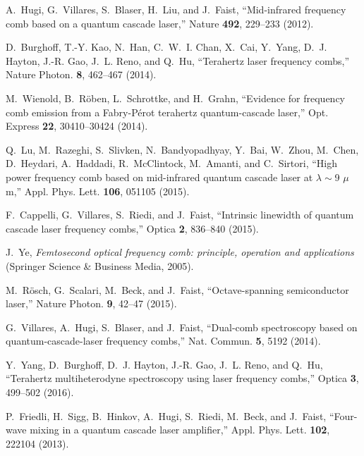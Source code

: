 \documentclass[10pt]{article}
\begin{document}
\begin{thebibliography}{10}
	\newcommand{\enquote}[1]{``#1''}
	
	A.~Hugi, G.~Villares, S.~Blaser, H.~Liu, and J.~Faist, \enquote{Mid-infrared
		frequency comb based on a quantum cascade laser,} Nature \textbf{492},
	229--233 (2012).
	
	D.~Burghoff, T.-Y. Kao, N.~Han, C.~W.~I. Chan, X.~Cai, Y.~Yang, D.~J. Hayton,
	J.-R. Gao, J.~L. Reno, and Q.~Hu, \enquote{Terahertz laser frequency combs,}
	Nature Photon. \textbf{8}, 462--467 (2014).
	
	M.~Wienold, B.~R{\"o}ben, L.~Schrottke, and H.~Grahn, \enquote{{Evidence for
			frequency comb emission from a Fabry-P{\'e}rot terahertz quantum-cascade
			laser},} Opt. Express \textbf{22}, 30410--30424 (2014).
	
	Q.~Lu, M.~Razeghi, S.~Slivken, N.~Bandyopadhyay, Y.~Bai, W.~Zhou, M.~Chen,
	D.~Heydari, A.~Haddadi, R.~McClintock, M.~Amanti, and C.~Sirtori,
	\enquote{High power frequency comb based on mid-infrared quantum cascade
		laser at $\lambda\sim$9 $\mu$m,} Appl. Phys. Lett. \textbf{106}, 051105
	(2015).
	
	F.~Cappelli, G.~Villares, S.~Riedi, and J.~Faist, \enquote{Intrinsic linewidth
		of quantum cascade laser frequency combs,} Optica \textbf{2}, 836--840
	(2015).
	
	J.~Ye, \emph{Femtosecond optical frequency comb: principle, operation and
		applications} (Springer Science \& Business Media, 2005).
	
	M.~R{\"o}sch, G.~Scalari, M.~Beck, and J.~Faist, \enquote{Octave-spanning
		semiconductor laser,} Nature Photon. \textbf{9}, 42--47 (2015).
	
	G.~Villares, A.~Hugi, S.~Blaser, and J.~Faist, \enquote{Dual-comb spectroscopy
		based on quantum-cascade-laser frequency combs,} Nat. Commun. \textbf{5},
	5192 (2014).
	
	Y.~Yang, D.~Burghoff, D.~J. Hayton, J.-R. Gao, J.~L. Reno, and Q.~Hu,
	\enquote{Terahertz multiheterodyne spectroscopy using laser frequency combs,}
	Optica \textbf{3}, 499--502 (2016).
	
	P.~Friedli, H.~Sigg, B.~Hinkov, A.~Hugi, S.~Riedi, M.~Beck, and J.~Faist,
	\enquote{Four-wave mixing in a quantum cascade laser amplifier,} Appl. Phys.
	Lett. \textbf{102}, 222104 (2013).
	

\end{thebibliography}
\end{document}

